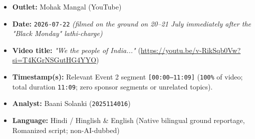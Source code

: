 \documentclass[10pt,a4paper]{article}
\begin{document}
\begin{itemize}[leftmargin=1.5em, itemsep=3pt, topsep=4pt]
  \item \textbf{Outlet:} Mohak Mangal (YouTube)
  \item \textbf{Date:} \texttt{2026-07-22} \textit{(filmed on the ground on 20--21 July immediately after the "Black Monday" lathi-charge)}
  \item \textbf{Video title:} \textit{"We the people of India..."} (\url{https://youtu.be/v-RikSqb0Vw?si=T4KGrNSGutHG4YYO})
  \item \textbf{Timestamp(s):} Relevant Event 2 segment \texttt{[00:00--11:09]} (\texttt{100\%} of video; total duration \texttt{11:09}; zero sponsor segments or unrelated topics).
  \item \textbf{Analyst:} Baani Solanki (\texttt{2025114016})
  \item \textbf{Language:} Hindi / Hinglish \& English (Native bilingual ground reportage, Romanized script; non-AI-dubbed)
\end{itemize}
\end{document}
